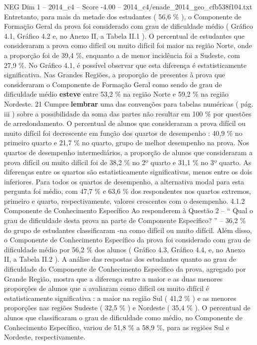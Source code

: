 \begin{textsample}{NEG Dim 1 – 2014\_c4 – Score -4.00 – 2014\_c4/enade\_2014\_geo\_cfb538f104.txt}
Entretanto, para mais da metade dos estudantes ( 56,6 \% ), o Componente de Formação Geral da prova foi considerado com grau de dificuldade médio ( Gráfico 4.1, Gráfico 4.2 e, no Anexo II, a Tabela II.1 ).
O percentual de estudantes que consideraram a prova como difícil ou muito difícil foi maior na região Norte, onde a proporção foi de 39,4 \%, enquanto a de menor incidência foi a Sudeste, com 27,9 \%.
No Gráfico 4.1, é possível observar que esta diferença é estatisticamente significativa.
Nas Grandes Regiões, a proporção de presentes à prova que consideraram o Componente de Formação Geral como sendo de grau de dificuldade médio \textbf{esteve} entre 53,2 \% na região Norte e 59,2 \% na região Nordeste. 21 Cumpre \textbf{lembrar} uma das convenções para tabelas numéricas ( pág. iii ) sobre a possibilidade da soma das partes não resultar em 100 \% por questões de arredondamento.
O percentual de alunos que consideraram a prova difícil ou muito difícil foi decrescente em função dos quartos de desempenho : 40,9 \% no primeiro quarto e 21,7 \% no quarto, grupo de melhor desempenho na prova.
Nos quartos de desempenho intermediários, a proporção de alunos que consideraram a prova difícil ou muito difícil foi de 38,2 \% no 2º quarto e 31,1 \% no 3º quarto.
As diferenças entre os quartos são estatisticamente significativas, menos entre os dois inferiores.
Para todos os quartos de desempenho, a alternativa modal para esta pergunta foi médio, com 47,7 \% e 63,6 \% dos respondentes nos quartos extremos, primeiro e quarto, respectivamente, valores crescentes com o desempenho. 4.1.2 Componente de Conhecimento Específico Ao responderem à Questão 2 – “ Qual o grau de dificuldade desta prova na parte de Componente Específico? ” – 36,2 \% do grupo de estudantes classificaram -na como difícil ou muito difícil.
Além disso, o Componente de Conhecimento Específico da prova foi considerado com grau de dificuldade médio por 56,2 \% dos alunos ( Gráfico 4.3, Gráfico 4.4, e, no Anexo II, a Tabela II.2 ).
A análise das respostas dos estudantes quanto ao grau de dificuldade do Componente de Conhecimento Específico da prova, agregado por Grande Região, mostra que a diferença entre a maior e as duas menores proporções de alunos que a avaliaram como difícil ou muito difícil é estatisticamente significativa : a maior na região Sul ( 41,2 \% ) e as menores proporções nas regiões Sudeste ( 32,5 \% ) e Nordeste ( 35,4 \% ).
O percentual de alunos que classificaram o grau de dificuldade como médio, no Componente de Conhecimento Específico, variou de 51,8 \% a 58,9 \%, para as regiões Sul e Nordeste, respectivamente.

\end{textsample}
